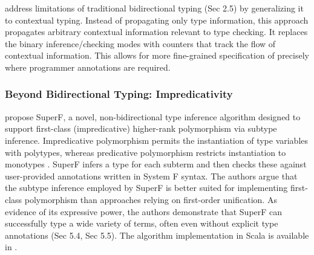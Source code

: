 \cite{xue-contextual-2024} address limitations of traditional bidirectional typing (Sec 2.5) by generalizing it to contextual typing. Instead of propagating only type information, this approach propagates arbitrary contextual information relevant to type checking. It replaces the binary inference/checking modes with counters that track the flow of contextual information. This allows for more fine-grained specification of precisely where programmer annotations are required.

\subsubsection{Beyond Bidirectional Typing: Impredicativity}

\citeauthor{parreaux-when-2024} \cite{parreaux-when-2024} propose SuperF, a novel, non-bidirectional type inference algorithm designed to support first-class (impredicative) higher-rank polymorphism via subtype inference. Impredicative polymorphism permits the instantiation of type variables with polytypes, whereas predicative polymorphism restricts instantiation to monotypes \cite[Sec 3.4]{jones-practical-2007}. SuperF infers a type for each subterm and then checks these against user-provided annotations written in System F syntax. The authors argue that the subtype inference employed by SuperF is better suited for implementing first-class polymorphism than approaches relying on first-order unification. As evidence of its expressive power, the authors demonstrate that SuperF can successfully type a wide variety of terms, often even without explicit type annotations (Sec 5.4, Sec 5.5). The algorithm implementation in Scala is available in \cite{github-hkust-taco-superf-2025}.